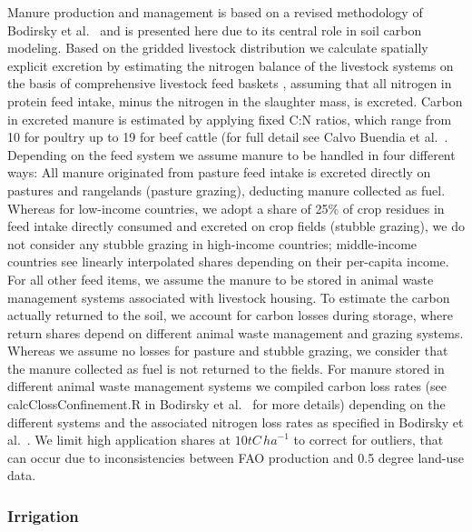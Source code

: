 \documentclass[gc, manuscript]{copernicus}
\begin{document}
Manure production and management is based on a revised methodology of Bodirsky et al.~\citeyearpar{bodirsky_n2o_2012} and is presented here due to its central role in soil carbon modeling. Based on the gridded livestock distribution we calculate spatially explicit excretion by estimating the nitrogen balance of the livestock systems on the basis of comprehensive livestock feed baskets \citep{weindl_livestock_2017}, assuming that all nitrogen in protein feed intake, minus the nitrogen in the slaughter mass, is excreted. Carbon in excreted manure is estimated by applying fixed C:N ratios, which range from 10 for poultry up to 19 for beef cattle (for full detail see Calvo Buendia et al.~\citeyearpar{ogle_cropland_in_ipcc_2019}.
Depending on the feed system we assume manure to be handled in four different ways:
All manure originated from pasture feed intake is excreted directly on pastures and rangelands (pasture grazing), deducting manure collected as fuel.
Whereas for low-income countries, we adopt a share of 25\% of crop residues in feed intake directly consumed and excreted on crop fields (stubble grazing), we do not consider any stubble grazing in high-income countries; middle-income countries see linearly interpolated shares depending on their per-capita income.
For all other feed items, we assume the manure to be stored in animal waste management systems associated with livestock housing.
To estimate the carbon actually returned to the soil, we account for carbon losses during storage, where return shares depend on different animal waste management and grazing systems. Whereas we assume no losses for pasture and stubble grazing, we consider that the manure collected as fuel is not returned to the fields. For manure stored in different animal waste management systems we compiled carbon loss rates (see calcClossConfinement.R in Bodirsky et al.~\citeyearpar{bodirsky_mrcommons_2020} for more details) depending on the different systems and the associated nitrogen loss rates as specified in Bodirsky et al.~\citeyearpar{bodirsky_n2o_2012}. We limit high application shares at \(10\unit{tC\,ha}^{-1}\) to correct for outliers, that can occur due to inconsistencies between FAO production and 0.5 degree land-use data.

\hypertarget{sec:irrigation}{%
\subsubsection{Irrigation}\label{sec:irrigation}}
\end{document}
